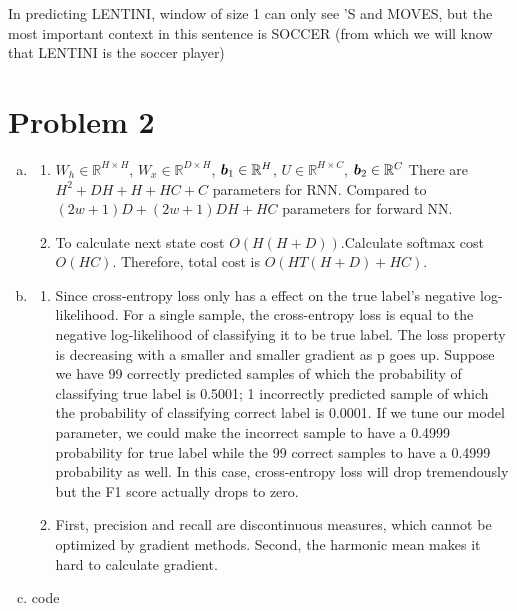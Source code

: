 \documentclass[11pt, oneside]{article}      %
\newcommand{\bb}{\mbox{\boldmath $b$}}
\newcommand{\real}[1]{\mbox{$\mathbb{R}^{#1}$}}
\newcommand{\hasPageBreak}{\newpage}
\begin{document}
\begin{enumerate}   [(a)]
\begin{enumerate}   [i]
In predicting LENTINI, window of size 1 can only see 'S and MOVES, but the most important context in this sentence is SOCCER (from which we will know that LENTINI is the soccer player)



\end{enumerate}



\end{enumerate}







\hasPageBreak
\section*{Problem 2}
\begin{enumerate}   [(a)]

\item 
\begin{enumerate}   [i]
\item $W_h \in \real{H \times H}$, 
		$W_x \in \real{D \times H}$, 
		$\bb_1 \in \real{H}$, 
		$U \in \real{H \times C}$, 
		$\bb_2 \in \real{C}$
There are $H^2+DH+H+HC+C$ parameters for RNN.
Compared to $(2w+1)D+(2w+1)DH+HC$ parameters for forward NN.
\item To calculate next state cost $O(H(H+D))$.Calculate softmax cost $O(HC)$. Therefore, total cost is $O(HT(H+D)+HC)$.
\end{enumerate}

\hasPageBreak
\item
\begin{enumerate}   [i]
\item Since cross-entropy loss only has a effect on the true label's negative log-likelihood. For a single sample, the cross-entropy loss is equal to the negative log-likelihood of classifying it to be true label. The loss property is decreasing with a smaller and smaller gradient as p goes up. Suppose we have 99 correctly predicted samples of which the probability of classifying true label is 0.5001; 1 incorrectly predicted sample of which the probability of classifying correct label is 0.0001. If we tune our model parameter, we could make the incorrect sample to have a 0.4999 probability for true label while the 99 correct samples to have a 0.4999 probability as well. In this case, cross-entropy loss will drop tremendously but the F1 score actually drops to zero.
\item First, precision and recall are discontinuous measures, which cannot be optimized by gradient methods. Second, the harmonic mean makes it hard to calculate gradient.
\end{enumerate}
\item code



\end{enumerate}
\end{document}
